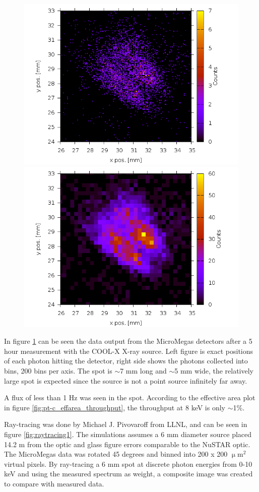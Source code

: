 \begin{figure}[htbp]
  \centering
    \includegraphics[width=0.47\linewidth,trim=40pt 0pt 30pt 0]{figures/cast/cast_5h_1000x.png}
    \includegraphics[width=0.47\linewidth,trim=40pt 0pt 30pt 0]{figures/cast/cast_5h_200x.png}
  \caption{\footnotesize }
  \label{fig:cast_5h_run}
\end{figure}

In figure \ref{fig:cast_5h_run} can be seen the data output from the MicroMegas detectors after a 5 hour measurement with the COOL-X X-ray source. Left figure is exact positions of each photon hitting the detector, right side shows the photons collected into bins, 200 bins per axis. The spot is $\sim$7 mm long and $\sim$5 mm wide, the relatively large spot is expected since the source is not a point source infinitely far away.

A flux of less than 1 Hz was seen in the spot. According to the effective area plot in figure \ref{fig:pt-c_effarea_throughput}, the throughput at 8 keV is only $\sim$1\%.

Ray-tracing was done by Michael J. Pivovaroff from LLNL, and can be seen in figure \ref{fig:raytracing1}. The simulations assumes a 6 mm diameter source placed 14.2 m from the optic and glass figure errors comparable to the NuSTAR optic. The MicroMegas data was rotated 45 degrees and binned into 200 x 200 $\upmu$m$^2$ virtual pixels. By ray-tracing a 6 mm spot at discrete photon energies from 0-10 keV and using the measured spectrum as weight, a composite image was created to compare with measured data.

